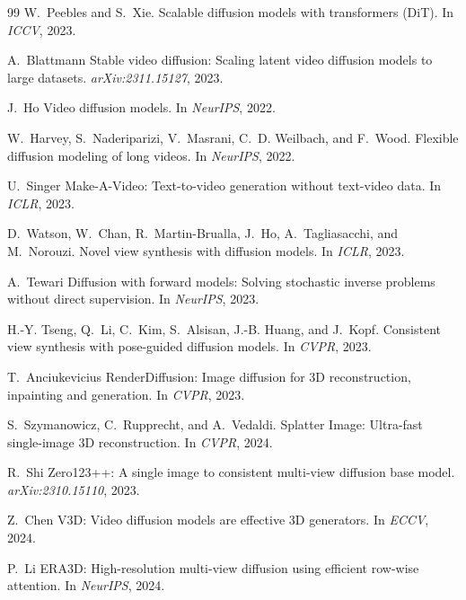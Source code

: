 \begin{thebibliography}{99}
W.~Peebles and S.~Xie.
Scalable diffusion models with transformers ({DiT}).
In \emph{ICCV}, 2023.


A.~Blattmann \etal
Stable video diffusion: Scaling latent video diffusion models to large datasets.
\emph{arXiv:2311.15127}, 2023.


J.~Ho \etal
Video diffusion models.
In \emph{NeurIPS}, 2022.


W.~Harvey, S.~Naderiparizi, V.~Masrani, C.~D. Weilbach, and F.~Wood.
Flexible diffusion modeling of long videos.
In \emph{NeurIPS}, 2022.


U.~Singer \etal
Make-A-Video: Text-to-video generation without text-video data.
In \emph{ICLR}, 2023.


D.~Watson, W.~Chan, R.~Martin-Brualla, J.~Ho, A.~Tagliasacchi, and M.~Norouzi.
Novel view synthesis with diffusion models.
In \emph{ICLR}, 2023.


A.~Tewari \etal
Diffusion with forward models: Solving stochastic inverse problems without
direct supervision.
In \emph{NeurIPS}, 2023.


H.-Y. Tseng, Q.~Li, C.~Kim, S.~Alsisan, J.-B. Huang, and J.~Kopf.
Consistent view synthesis with pose-guided diffusion models.
In \emph{CVPR}, 2023.


T.~Anciukevicius \etal
{RenderDiffusion}: Image diffusion for 3{D} reconstruction, inpainting and
generation.
In \emph{CVPR}, 2023.


S.~Szymanowicz, C.~Rupprecht, and A.~Vedaldi.
{Splatter Image}: Ultra-fast single-image 3{D} reconstruction.
In \emph{CVPR}, 2024.


R.~Shi \etal
Zero123++: A single image to consistent multi-view diffusion base model.
\emph{arXiv:2310.15110}, 2023.


Z.~Chen \etal
{V3D}: Video diffusion models are effective 3{D} generators.
In \emph{ECCV}, 2024.


P.~Li \etal
{ERA3D}: High-resolution multi-view diffusion using efficient row-wise
attention.
In \emph{NeurIPS}, 2024.



\end{thebibliography}
